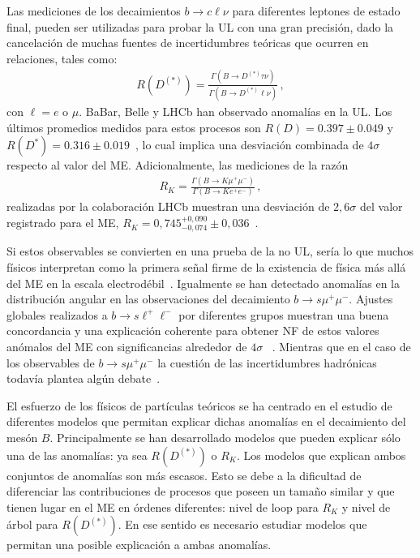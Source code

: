 Las mediciones de los decaimientos $b \rightarrow c \ell \nu$ para diferentes leptones de estado final, pueden ser utilizadas para probar la UL con una gran precisión, dado la cancelación de muchas fuentes de incertidumbres teóricas que ocurren en relaciones, tales como:
\begin{align}
R(D^{(*)}) = \frac{\Gamma(B \rightarrow D^{(*)} \tau \nu)}{\Gamma(B \rightarrow D^{(*)} \ell \nu)}\,,
\end{align}
con $\ell = e$ o $\mu$. BaBar, Belle y LHCb han observado  anomalías en la UL. Los últimos promedios medidos para estos procesos son $R(D) = 0.397 \pm 0.049$ y $R(D^*) = 0.316 \pm 0.019$~\cite{Aaij:2014ora}, lo cual implica una desviación combinada de $4 \sigma$ respecto al valor del ME. Adicionalmente, las mediciones de la razón
\begin{align}
R_K = \frac{\Gamma(B \rightarrow K \mu ^+ \mu ^-)}{\Gamma(B \rightarrow K e^+ e^-)}\,,
\end{align}
realizadas por la colaboración LHCb muestran una desviación de $2,6 \sigma$ del valor registrado para el ME, $R_K = 0,745 ^{+0,090} _{-0,074} \pm 0,036$~\cite{Aaij:2014ora}. 

Si estos observables se convierten en una prueba de la no UL, sería lo que muchos físicos interpretan como la primera señal firme de la existencia de física más allá del ME en la escala electrodébil~\cite{Hiller:2003js,Guevara:2015pza,Bordone:2016gaq}.
Igualmente se han detectado anomalías en la distribución angular en las observaciones del decaimiento $b \rightarrow s \mu ^+ \mu ^-$. Ajustes globales realizados a $b \rightarrow s \ell ^+ \ell ^-$ por diferentes grupos muestran una buena concordancia y una explicación coherente para obtener NF de estos valores anómalos del ME con significancias alrededor de $4 \sigma$ ~\cite{Descotes-Genon:2013wba,Horgan:2013pva,Ghosh:2014awa,Hurth:2014vma,Altmannshofer:2014rta,Altmannshofer:2015sma,Descotes-Genon:2015uva,Hurth:2016fbr}. Mientras que en el caso de los observables de $b \rightarrow s \mu ^+ \mu ^-$ la cuestión de las incertidumbres hadrónicas todavía plantea algún debate~\cite{Beaujean:2013soa,Descotes-Genon:2015uva,Jager:2014rwa,Hurth:2014vma,Lyon:2014hpa,Ciuchini:2015qxb}. 

El esfuerzo de los físicos de partículas teóricos se ha centrado en el estudio de diferentes modelos que permitan explicar dichas anomalías en el decaimiento del mesón $B$. Principalmente se han desarrollado modelos que pueden explicar sólo una de las anomalías: ya sea $R(D^{(*)})$ o $R_K$. Los modelos que explican ambos conjuntos de anomalías son más escasos. Esto se debe a la dificultad de diferenciar las contribuciones de procesos que poseen un tamaño similar y  que tienen lugar en el ME en órdenes diferentes: nivel de loop para $R_K$ y nivel de árbol para $R (D^{(*)})$.  En ese sentido es necesario estudiar modelos que permitan una posible explicación a ambas anomalías.

